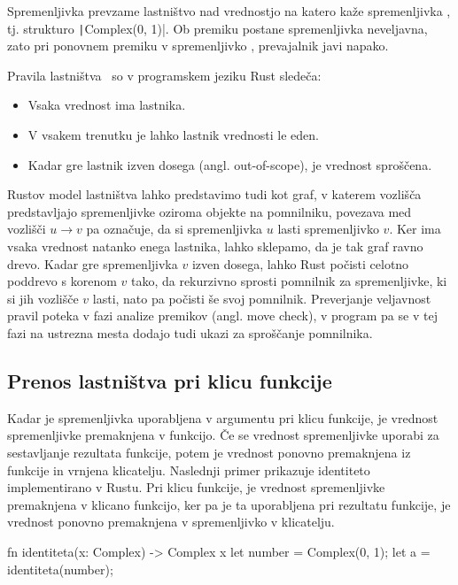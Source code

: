 Spremenljivka  prevzame lastništvo nad vrednostjo na katero kaže spremenljivka , tj. strukturo \texttt|Complex(0, 1)|. Ob premiku postane spremenljivka  neveljavna, zato pri ponovnem premiku v spremenljivko , prevajalnik javi napako.

Pravila lastništva~\cite{klabnik2023rust} so v programskem jeziku Rust sledeča:

\begin{itemize}
	\itemsep 0em
	\item Vsaka vrednost ima lastnika.
	\item V vsakem trenutku je lahko lastnik vrednosti le eden.
	\item Kadar gre lastnik izven dosega (angl. out-of-scope), je vrednost spro\-šče\-na.
\end{itemize}

Rustov model lastništva lahko predstavimo tudi kot graf, v katerem vozlišča predstavljajo spremenljivke oziroma objekte na pomnilniku, povezava med vozlišči $u \to v$ pa označuje, da si spremenljivka $u$ lasti spremenljivko $v$. Ker ima vsaka vrednost natanko enega lastnika, lahko sklepamo, da je tak graf ravno drevo. Kadar gre spremenljivka $v$ izven dosega, lahko Rust počisti celotno poddrevo s korenom $v$ tako, da rekurzivno sprosti pomnilnik za spremenljivke, ki si jih vozlišče $v$ lasti, nato pa počisti še svoj pomnilnik. Preverjanje veljavnost pravil poteka v fazi analize premikov (angl. move check), v program pa se v tej fazi na ustrezna mesta dodajo tudi ukazi za sproščanje pomnilnika.

\subsection{Prenos lastništva pri klicu funkcije}

Kadar je spremenljivka uporabljena v argumentu pri klicu funkcije, je vrednost spremenljivke premaknjena v funkcijo. Če se vrednost spremenljivke uporabi za sestavljanje rezultata funkcije, potem je vrednost ponovno premaknjena iz funkcije in vrnjena klicatelju. Naslednji primer prikazuje identiteto implementirano v Rustu. Pri klicu funkcije, je vrednost spremenljivke  premaknjena v klicano funkcijo, ker pa je ta uporabljena pri rezultatu funkcije, je vrednost ponovno premaknjena v spremenljivko  v klicatelju.

\begin{rust-success}
fn identiteta(x: Complex) -> Complex { x }
let number = Complex(0, 1);
let a = identiteta(number);
\end{rust-success}


